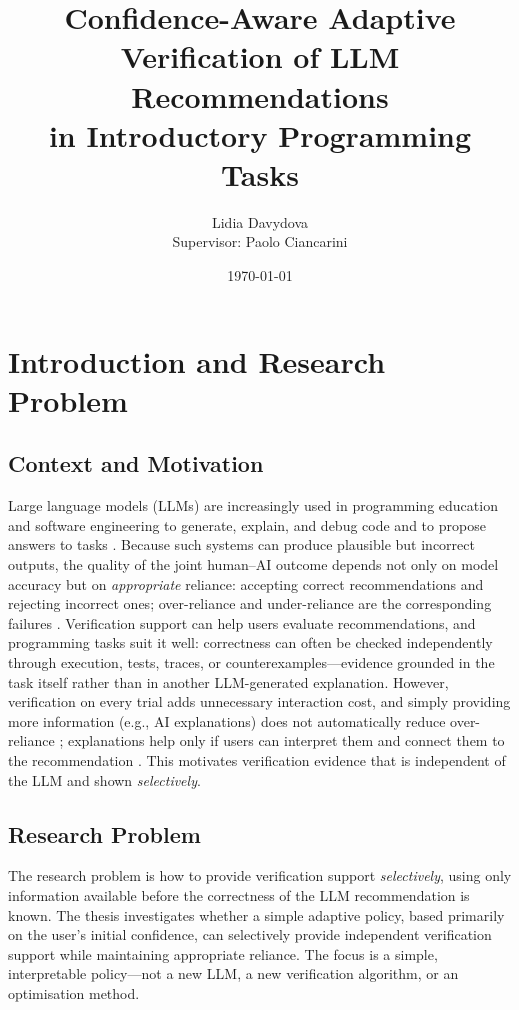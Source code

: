 \documentclass[oneside,final,14pt,a4paper]{extreport}
\title{Confidence-Aware Adaptive Verification of LLM Recommendations\\
in Introductory Programming Tasks}
\author{Lidia Davydova\\[1mm]Supervisor: Paolo Ciancarini}
\date{\today}
\begin{document}
\maketitle

\section{Introduction and Research Problem}

\subsection{Context and Motivation}

Large language models (LLMs) are increasingly used in programming education and
software engineering to generate, explain, and debug code and to propose
answers to tasks \cite{Ma2023,Cambaz2024}. Because such systems can produce
plausible but incorrect outputs, the quality of the joint human--AI outcome
depends not only on model accuracy but on \emph{appropriate} reliance:
accepting correct recommendations and rejecting incorrect ones; over-reliance
and under-reliance are the corresponding failures
\cite{PoursabziSangdeh2021,Vasconcelos2023}. Verification support can help
users evaluate recommendations, and programming tasks suit it well:
correctness can often be checked independently through execution, tests,
traces, or counterexamples---evidence grounded in the task itself rather than
in another LLM-generated explanation. However, verification on every trial
adds unnecessary interaction cost, and simply providing more information
(e.g., AI explanations) does not automatically reduce over-reliance
\cite{Bucinca2021,Vasconcelos2023}; explanations help only if users can
interpret them and connect them to the recommendation
\cite{ma2024arereallysureunderstanding}. This motivates verification evidence
that is independent of the LLM and shown \emph{selectively}.

\subsection{Research Problem}

The research problem is how to provide verification support \emph{selectively},
using only information available before the correctness of the LLM
recommendation is known. The thesis investigates whether a simple adaptive
policy, based primarily on the user's initial confidence, can selectively
provide independent verification support while maintaining appropriate
reliance. The focus is a simple, interpretable policy---not a new LLM, a new
verification algorithm, or an optimisation method.
\end{document}
